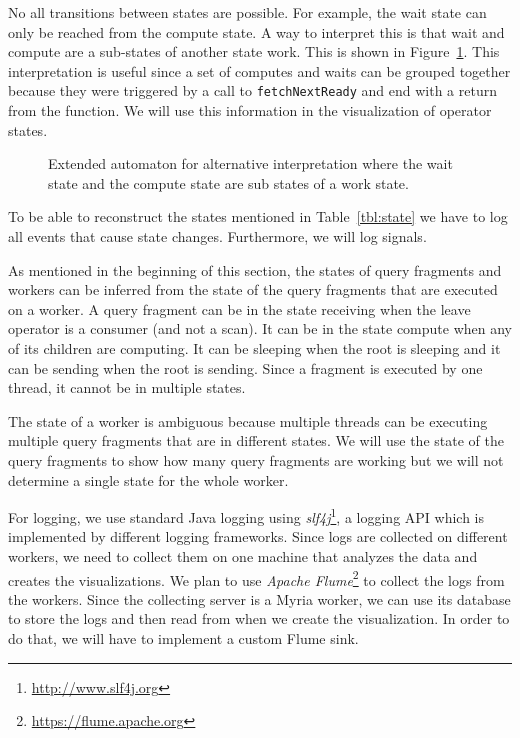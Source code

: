 \documentclass[11pt]{article}
\begin{document}
No all transitions between states are possible. For example, the wait state can only be reached from the compute state. A way to interpret this is that wait and compute are a sub-states of another state work. This is shown in Figure~\ref{fig:extd_compute}. This interpretation is useful since a set of computes and waits can be grouped together because they were triggered by a call to \texttt{fetchNextReady} and end with a return from the function. We will use this information in the visualization of operator states.

\begin{figure}[h]
  \begin{center}
    \def\svgwidth{0.35\columnwidth}
    
  \end{center}
  \caption{Extended automaton for alternative interpretation where the wait state and the compute state are sub states of a work state.}
  \label{fig:extd_compute}
\end{figure}

To be able to reconstruct the states mentioned in Table~\ref{tbl:state} we have to log all events that cause state changes. Furthermore, we will log signals. %

As mentioned in the beginning of this section, the states of query fragments and workers can be inferred from the state of the query fragments that are executed on a worker. A query fragment can be in the state receiving when the leave operator is a consumer (and not a scan). It can be in the state compute when any of its children are computing. It can be sleeping when the root is sleeping and it can be sending when the root is sending. Since a fragment is executed by one thread, it cannot be in multiple states.

The state of a worker is ambiguous because multiple threads can be executing multiple query fragments that are in different states. We will use the state of the query fragments to show how many query fragments are working but we will not determine a single state for the whole worker.


For logging, we use standard Java logging using \emph{slf4j}\footnote{\url{http://www.slf4j.org}}, a logging API which is implemented by different logging frameworks. Since logs are collected on different workers, we need to collect them on one machine that analyzes the data and creates the visualizations. We plan to use \emph{Apache Flume}\footnote{\url{https://flume.apache.org}} to collect the logs from the workers. Since the collecting server is a Myria worker, we can use its database to store the logs and then read from when we create the visualization. In order to do that, we will have to implement a custom Flume sink.
\end{document}
